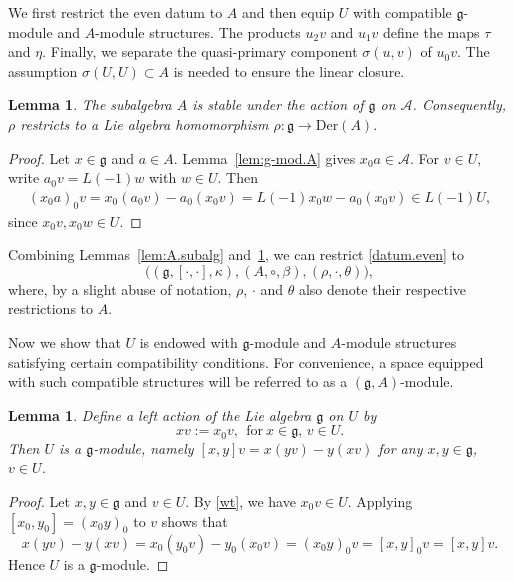 \documentclass[12pt]{article}
\numberwithin{equation}{section}
\newtheorem{lemma}[theorem]{Lemma}
\theoremstyle{definition}
\theoremstyle{plain}
\newcommand{\fg}{\mathfrak{g}}
\newcommand{\Der}{\mathrm{Der }}
\newcommand{\cA}{\ensuremath{\mathcal{A}}}
\begin{document}
We first restrict the even datum to $A$ and then equip $U$ with compatible $\fg$-module and $A$-module structures. The products $u_2v$ and $u_1v$ define the maps $\tau$ and $\eta$. Finally, we separate the quasi-primary component $\sigma(u,v)$ of $u_0v$. The assumption $\sigma(U,U)\subset A$ is needed to ensure the linear closure.  

\begin{lemma}\label{lem:g-stable.A}
The subalgebra $A$ is stable under the action of $\fg$ on $\cA$. Consequently, $\rho$ restricts to a Lie algebra homomorphism $\rho:\fg\rightarrow\Der(A)$.
\end{lemma}
\begin{proof}
    Let $x\in\fg$ and $a\in A$. Lemma~\ref{lem:g-mod.A} gives $x_0a\in\cA$. For $v\in U$, write $a_0v=L(-1)w$ with $w\in U$. Then
    \begin{align*}
        (x_0a)_0v=x_0(a_0v)-a_0(x_0v)=L(-1)x_0w-a_0(x_0v)\in L(-1)U,
    \end{align*}
since $x_0v,x_0w\in U$.
\end{proof}

Combining Lemmas~\ref{lem:A.subalg} and~\ref{lem:g-stable.A}, we can restrict \eqref{datum.even} to
\begin{equation}\label{datum.even.A}
    \big((\fg,[\cdot,\cdot],\kappa),(A,\circ,\beta),(\rho,\cdot,\theta)\big),
\end{equation}
where, by a slight abuse of notation, $\rho$, $\cdot$ and $\theta$ also denote their respective restrictions to $A$.

Now we show that $U$ is endowed with $\fg$-module and $A$-module structures satisfying certain compatibility conditions. For convenience, a space equipped with such compatible structures will be referred to as a $(\fg,A)$-module.

\begin{lemma}
    Define a left action of the Lie algebra $\fg$ on $U$ by
    \begin{equation*}
        xv:=x_0v,\ \ \text{for}\ x\in\fg,\, v\in U.
    \end{equation*}
    Then $U$ is a $\fg$-module, namely $[x,y]v=x(yv)-y(xv)$ for any $x,y\in\fg$, $v\in U$.
\end{lemma}
\begin{proof}
    Let $x,y\in\fg$ and $v\in U$. By \eqref{wt}, we have $x_0v\in U$. Applying $[x_0,y_0]=(x_0y)_0$ to $v$ shows that
    \begin{equation*}
        x(yv)-y(xv)=x_0(y_0v)-y_0(x_0v)=(x_0y)_0v=[x,y]_0v=[x,y]v.
    \end{equation*}
    Hence $U$ is a $\fg$-module.
\end{proof}
\end{document}
